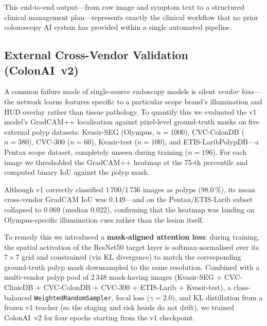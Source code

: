 \documentclass[conference]{IEEEtran}
\begin{document}
This end-to-end output---from raw image and symptom text to a structured
clinical management plan---represents exactly the clinical workflow that
no prior colonoscopy AI system has provided within a single automated pipeline.

\subsection{External Cross-Vendor Validation (ColonAI~v2)}
\label{sec:v2}

A common failure mode of single-source endoscopy models is silent
\emph{vendor bias}---the network learns features specific to a particular
scope brand's illumination and HUD overlay rather than tissue
pathology. To quantify this we evaluated the v1 model's GradCAM++
localisation against pixel-level ground-truth masks on five external
polyp datasets: Kvasir-SEG (Olympus, $n{=}1000$), CVC-ColonDB ($n{=}380$),
CVC-300 ($n{=}60$), Kvasir-test ($n{=}100$), and ETIS-LaribPolypDB---a
Pentax scope dataset, completely unseen during training ($n{=}196$). For
each image we thresholded the GradCAM++ heatmap at the 75-th percentile
and computed binary IoU against the polyp mask.

Although v1 correctly classified 1\,700/1\,736 images as polyps
(98.0\,\%), its mean cross-vendor GradCAM IoU was 0.149---and on the
Pentax/ETIS-Larib subset collapsed to 0.069 (median 0.022), confirming
that the heatmap was landing on Olympus-specific illumination cues
rather than the lesion itself.

To remedy this we introduced a \textbf{mask-aligned attention loss}:
during training, the spatial activation of the ResNet50 target layer is
softmax-normalised over its $7{\times}7$ grid and constrained (via KL
divergence) to match the corresponding ground-truth polyp mask
downsampled to the same resolution. Combined with a multi-vendor polyp
pool of 2\,348 mask-having images (Kvasir-SEG + CVC-ClinicDB +
CVC-ColonDB + CVC-300 + ETIS-Larib + Kvasir-test), a class-balanced
\texttt{WeightedRandomSampler}, focal loss ($\gamma{=}2.0$), and KL
distillation from a frozen v1 teacher (so the staging and risk heads do
not drift), we trained ColonAI~v2 for four epochs starting from the v1
checkpoint.
\end{document}
